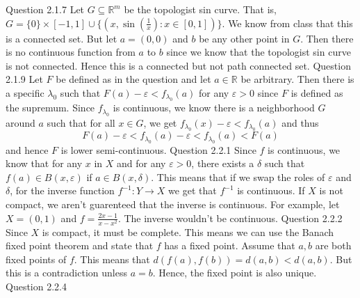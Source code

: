\documentclass[12pt]{exam}
\begin{document}
\begin{questions}
\question Question 2.1.7\newline
Let $G \subseteq \mathbb{R}^m$ be the topologist sin curve. That is, $G = \{0\} \times [-1,1] \cup \{(x, \sin(\frac{1}{x}): x\in [0, 1])\}$. We know from class that this is a connected set. But let $a = (0,0)$ and $b$ be any other point in $G$. Then there is no continuous function from $a$ to $b$ since we know that the topologist sin curve is not connected. Hence this is a connected but not path connected set. 
\question Question 2.1.9\newline
Let $F$ be defined as in the question and let $a\in \mathbb{R}$ be arbitrary. Then there is a specific $\lambda_0$ such that $F(a) - \varepsilon < f_{\lambda_0}(a)$ for any $\varepsilon > 0$ since $F$ is defined as the supremum. Since $f_{\lambda_0}$ is continuous, we know there is a neighborhood $G$ around $a$ such that for all $x \in G$, we get $f_{\lambda_0}(x) - \varepsilon < f_{\lambda_0}(a)$ and thus \[F(a) -\varepsilon< f_{\lambda_0}(a) - \varepsilon < f_{\lambda_0}(a) < F(a)\] and hence $F$ is lower semi-continuous.
\question Question 2.2.1 \newline
Since $f$ is continuous, we know that for any $x$ in $X$ and for any $\varepsilon > 0$, there exists a $\delta$ such that $f(a) \in B(x, \varepsilon)$ if $a \in B(x, \delta)$. This means that if we swap the roles of $\varepsilon$ and $\delta$, for the inverse function $f^{-1}: Y \rightarrow X$ we get that $f^{-1}$ is continuous. If $X$ is not compact, we aren't guarenteed that the inverse is continuous. For example, let $X = (0,1)$ and $f = \frac{2x-1}{x-x^2}$. The inverse wouldn't be continuous.
\question Question 2.2.2\newline
Since $X$ is compact, it must be complete. This means we can use the Banach fixed point theorem and state that $f$ has a fixed point. Assume that $a,b$ are both fixed points of $f$. This means that $d(f(a) , f(b)) = d(a,b) < d(a,b)$. But this is a contradiction unless $a = b$. Hence, the fixed point is also unique. 
\question Question 2.2.4
\end{questions}
\end{document}
